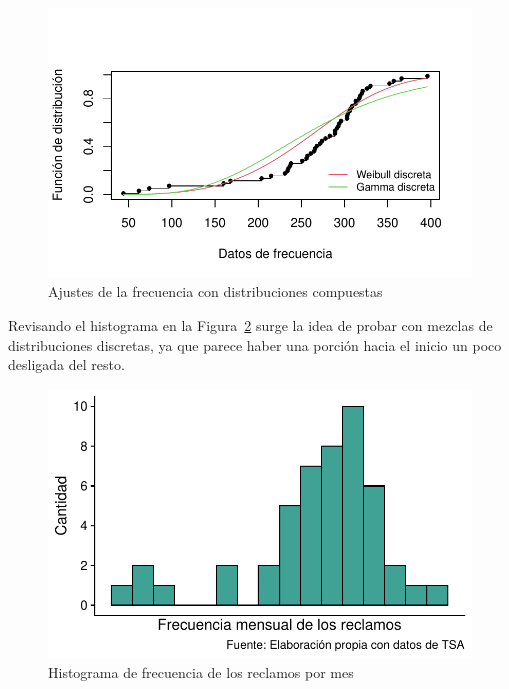 \documentclass[
  letterpaper,
  onepage,
  openany]{scrreprt}
\begin{document}
\begin{figure}[H]

\caption{\label{fig-ajusteVersionesDiscretas}Ajustes de la frecuencia
con distribuciones compuestas}

{\centering \includegraphics{./Bit4_files/figure-pdf/fig-ajusteVersionesDiscretas-1.pdf}

}

\end{figure}

Revisando el histograma en la Figura~\ref{fig-histograma_frecuencia}
surge la idea de probar con mezclas de distribuciones discretas, ya que
parece haber una porción hacia el inicio un poco desligada del resto.

\begin{figure}[H]

\caption{\label{fig-histograma_frecuencia}Histograma de frecuencia de
los reclamos por mes}

{\centering \includegraphics{./Bit4_files/figure-pdf/fig-histograma_frecuencia-1.pdf}

}

\end{figure}
\end{document}
